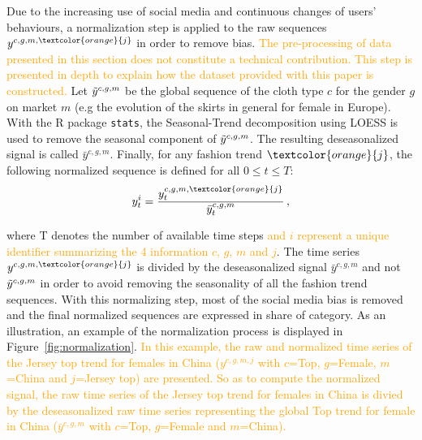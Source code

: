\documentclass[10pt]{article} %
\begin{document}
Due to the increasing use of social media and continuous changes of users' behaviours, a normalization step is applied to the raw sequences $y^{c,g,m,\textcolor{orange}{j}}$ in order to remove bias. \textcolor{orange}{The pre-processing of data presented in this section does not constitute a technical contribution. This step is presented in depth to  explain how the dataset provided with this paper is constructed.} Let $\Tilde{y}^{c,g,m}$ be the global sequence of the cloth type $c$ for the gender $g$ on market $m$ (e.g the evolution of the skirts in general for female in Europe). With the R package \texttt{stats}, the Seasonal-Trend decomposition using LOESS  \citep{cleveland1990} is used to remove the seasonal component of $\Tilde{y}^{c,g,m}$. The resulting deseasonalized signal is called  $\bar{y}^{c,g,m}$. Finally, for any fashion trend $\textcolor{orange}{j}$, the following normalized sequence is defined for all $ 0 \leq t \leq T$:
\begin{equation}
    y^{i}_t = \frac{y^{c,g,m,\textcolor{orange}{j}}_{t}}{\bar{y}^{c,g,m}_t}\,,
\end{equation}

where T denotes the number of available time steps \textcolor{orange}{and $i$ represent a unique identifier summarizing the 4 information $c$, $g$, $m$ and $j$}. The time series $y^{c,g,m,\textcolor{orange}{j}}$ is divided by the deseasonalized signal $\bar{y}^{c,g,m}$ and not $\Tilde{y}^{c,g,m}$ in order to avoid removing the seasonality of all the fashion trend sequences. With this normalizing step, most of the social media bias is removed and the final normalized sequences are expressed in share of category. As an illustration, an example of the normalization process is displayed in Figure~\ref{fig:normalization}. \textcolor{orange}{In this example, the raw and normalized time series of the Jersey top trend for females in China ($y^{c,g,m,j}$ with $c$=Top, $g$=Female, $m$=China and $j$=Jersey top) are presented. So as to compute the normalized signal, the raw time series of the Jersey top trend for females in China is divied by the deseasonalized raw time series representing the global Top trend for female in China ($\bar{y}^{c,g,m}$ with $c$=Top, $g$=Female and $m$=China).}
\end{document}
